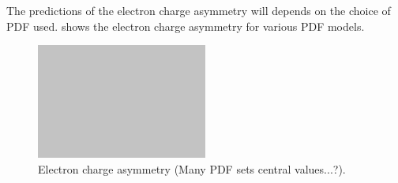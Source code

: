 The predictions of the electron charge asymmetry will depends on the choice of
\ac{PDF} used. 
 shows the electron charge asymmetry for
various \ac{PDF} models.

\begin{figure}[htb]
  \centering
  \includegraphics[width=0.5\textwidth]{placeholder}
  \caption{Electron charge asymmetry (Many PDF sets central values...?).}
  \label{wbos:asym_pdf}
\end{figure}








